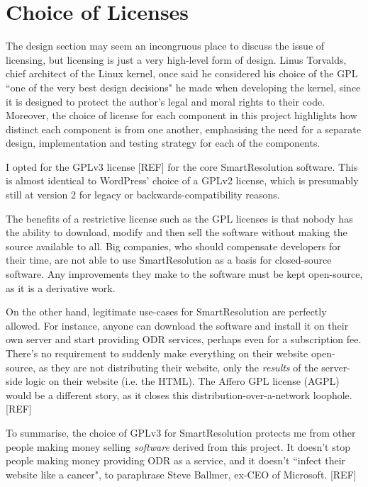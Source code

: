 \section{Choice of Licenses}

The design section may seem an incongruous place to discuss the issue of licensing, but licensing is just a very high-level form of design. Linus Torvalds, chief architect of the Linux kernel, once said he considered his choice of the GPL ``one of the very best design decisions" he made when developing the kernel, since it is designed to protect the author's legal and moral rights to their code. Moreover, the choice of license for each component in this project highlights how distinct each component is from one another, emphasising the need for a separate design, implementation and testing strategy for each of the components. %

I opted for the GPLv3 license [REF] for the core SmartResolution software. This is almost identical to WordPress' choice of a GPLv2 license, which is presumably still at version 2 for legacy or backwards-compatibility reasons.

The benefits of a restrictive license such as the GPL licenses is that nobody has the ability to download, modify and then sell the software without making the source available to all. Big companies, who should compensate developers for their time, are not able to use SmartResolution as a basis for closed-source software. Any improvements they make to the software must be kept open-source, as it is a derivative work.

On the other hand, legitimate use-cases for SmartResolution are perfectly allowed. For instance, anyone can download the software and install it on their own server and start providing ODR services, perhaps even for a subscription fee. There's no requirement to suddenly make everything on their website open-source, as they are not distributing their website, only the \emph{results} of the server-side logic on their website (i.e. the HTML). The Affero GPL license (AGPL) would be a different story, as it closes this distribution-over-a-network loophole. [REF]

To summarise, the choice of GPLv3 for SmartResolution protects me from other people making money selling \emph{software} derived from this project. It doesn't stop people making money providing ODR as a service, and it doesn't ``infect their website like a cancer", to paraphrase Steve Ballmer, ex-CEO of Microsoft. [REF]

